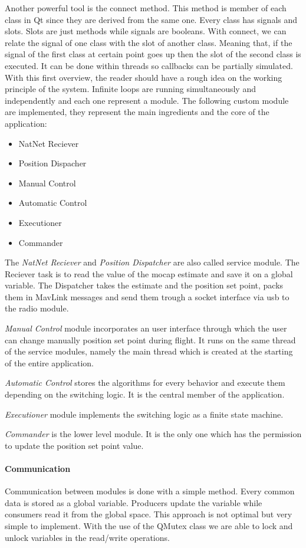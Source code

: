 Another powerful tool is the connect method. This method is member of each class in Qt since they are derived from the same one. Every class has signals and slots. Slots are just methods while signals are booleans. With connect, we can relate the signal of one class with the slot of another class. Meaning that, if the signal of the first class at certain point goes up then the slot of the second class is executed. It can be done within threads so callbacks can be partially simulated. 
With this first overview, the reader should have a rough idea on the working principle of the system. Infinite loops are running simultaneously and independently and each one represent a module. The following custom module are implemented, they represent the main ingredients and the core of the application: \begin{itemize}
\item NatNet Reciever
\item Position Dispacher 
\item Manual Control
\item Automatic Control 
\item Executioner
\item Commander
\end{itemize}
The \textit{NatNet Reciever} and \textit{Position Dispatcher} are also called service module. The Reciever task is to read the value of the mocap estimate and save it on a global variable. The Dispatcher takes the estimate and the position set point, packs them in MavLink messages and send them trough a socket interface via usb to the radio module. 

\textit{Manual Control} module incorporates an user interface through which the user can change manually position set point during flight. It runs on the same thread of the service modules, namely the main thread which is created at the starting of the entire application. 

\textit{Automatic Control} stores the algorithms for every behavior and execute them depending on the switching logic. It is the central member of the application.

\textit{Executioner} module implements the switching logic as a finite state machine.

\textit{Commander} is the lower level module. It is the only one which has the permission to update the position set point value.

\paragraph{Communication} Communication between modules is done with a simple method. Every common data is stored as a global variable. Producers update the variable while consumers read it from the global space. This approach is not optimal but very simple to implement. With the use of the QMutex class we are able to lock and unlock variables in the read/write operations.

